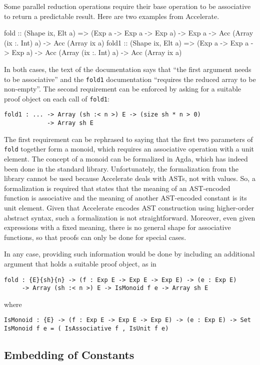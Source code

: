 \documentclass{llncs}
\begin{document}
Some parallel reduction operations require their base operation to be
associative to return a predictable result. Here are two examples from
Accelerate. 
\begin{hcode}
fold  :: (Shape ix, Elt a) =>
         (Exp a -> Exp a -> Exp a) -> Exp a ->
         Acc (Array (ix :. Int) a) -> Acc (Array ix a)
fold1 :: (Shape ix, Elt a) =>
         (Exp a -> Exp a -> Exp a) ->
         Acc (Array (ix :. Int) a) -> Acc (Array ix a)
\end{hcode}
In both cases, the text of the documentation says that ``the first
argument needs to be associative'' and the \texttt{fold1}
documentation ``requires the reduced array to be non-empty''.
The second requirement can be enforced by asking for a suitable proof
object on each call of \texttt{fold1}:
\begin{verbatim}
fold1 : ... -> Array (sh :< n >) E -> (size sh * n > 0)
            -> Array sh E
\end{verbatim}
The first requirement can be rephrased to saying that the first two
parameters of \texttt{fold} together form a monoid, which requires an
associative operation with a unit element. The concept of a monoid
can be formalized in Agda, which has indeed been done in the standard
library. Unfortunately, the formalization from the library cannot be
used because Accelerate deals with ASTs, not with values. So, a
formalization is required that states that the meaning of an
AST-encoded function is associative and the meaning of another
AST-encoded constant is its unit element. Given that Accelerate
encodes AST construction using higher-order abstract syntax, such a
formalization is not straightforward. Moreover, even given expressions
with a fixed meaning, there is no general shape for associative
functions, so that proofs can only be done for special cases. 

In any case, providing such information would be done by including an
additional argument that holds a suitable proof object, as in
\begin{verbatim}
fold : {E}{sh}{n} -> (f : Exp E -> Exp E -> Exp E) -> (e : Exp E)
     -> Array (sh :< n >) E -> IsMonoid f e -> Array sh E
\end{verbatim}
where
\begin{verbatim}
IsMonoid : {E} -> (f : Exp E -> Exp E -> Exp E) -> (e : Exp E) -> Set
IsMonoid f e = ( IsAssociative f , IsUnit f e)
\end{verbatim}

\subsection{Embedding of Constants}
\label{sec:embedding-constants}
\end{document}
